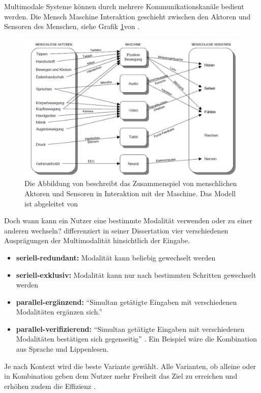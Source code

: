 Multimodale Systeme können durch mehrere Kommunikationskanäle bedient werden. 
Die Mensch Maschine Interaktion geschieht zwischen den Aktoren und Sensoren des Menschen, siehe Grafik \ref{fig:Multimodalitaet}von \citep{neuss_2001}.
\begin{figure}
	\centering
		\includegraphics[width=1\textwidth]{img/Multimodalitaet.JPG}
	\caption[multimodale Kommunikationskanäle]{Die Abbildung von \citep{neuss_2001} beschreibt das Zusammenspiel von menschlichen Aktoren und Sensoren in Interaktion mit der Maschine. Das Modell ist abgeleitet von \citep{sharma1998toward}}
	\label{fig:Multimodalitaet}
\end{figure}
Doch wann kann ein Nutzer eine bestimmte Modalität verwenden oder zu einer anderen wechseln?
\citet{neuss_2001} differenziert in seiner Dissertation vier verschiedenen Ausprägungen der Multimodalität hinsichtlich der Eingabe.
\begin{itemize}
	\item \textbf{seriell-redundant:} Modalität kann beliebig gewechselt werden
	\item \textbf{seriell-exklusiv:} Modalität kann nur nach bestimmten Schritten gewechselt werden
	\item \textbf{parallel-ergänzend:} "`Simultan getätigte Eingaben mit verschiedenen Modalitäten ergänzen sich."'\citep{neuss_2001}
	\item \textbf{parallel-verifizierend:} "`Simultan getätigte Eingaben mit verschiedenen Modalitäten bestätigen sich gegenseitig"' \citep{neuss_2001}. Ein Beispiel wäre die Kombination aus Sprache und Lippenlesen.
\end{itemize}
Je nach Kontext wird die beste Variante gewählt. 
Alle Varianten, ob alleine oder in Kombination geben dem Nutzer mehr Freiheit das Ziel zu erreichen und erhöhen zudem die Effizienz \citep{neuss_2001}. 

